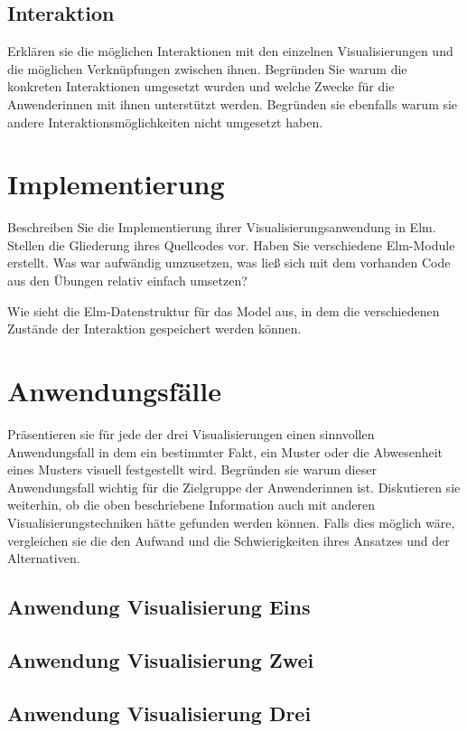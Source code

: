 \documentclass[usegeometry=true]{scrartcl}
\begin{document}
\subsection{Interaktion}
Erklären sie die möglichen Interaktionen mit den einzelnen Visualisierungen und die möglichen Verknüpfungen zwischen ihnen. Begründen Sie warum die konkreten Interaktionen umgesetzt wurden und welche Zwecke für die Anwenderinnen mit ihnen unterstützt werden. Begründen sie ebenfalls warum sie andere Interaktionsmöglichkeiten nicht umgesetzt haben. 

\section{Implementierung}
Beschreiben Sie die Implementierung ihrer Visualisierungsanwendung in Elm. Stellen die Gliederung ihres Quellcodes vor. Haben Sie verschiedene Elm-Module erstellt. Was war aufwändig umzusetzen, was ließ sich mit dem vorhanden Code aus den Übungen relativ einfach umsetzen? 

Wie sieht die Elm-Datenstruktur für das Model aus, in dem die verschiedenen Zustände der Interaktion gespeichert werden können.

\section{Anwendungsfälle}
Präsentieren sie für jede der drei Visualisierungen einen sinnvollen Anwendungsfall in dem ein bestimmter Fakt, ein Muster oder die Abwesenheit eines Musters visuell festgestellt wird. Begründen sie warum dieser Anwendungsfall wichtig für die Zielgruppe der Anwenderinnen ist. Diskutieren sie weiterhin, ob die oben beschriebene Information auch mit anderen Visualisierungstechniken hätte gefunden werden können. Falls dies möglich wäre, vergleichen sie die den Aufwand und die Schwierigkeiten ihres Ansatzes und der Alternativen. 
\subsection{Anwendung Visualisierung Eins}
\subsection{Anwendung Visualisierung Zwei}
\subsection{Anwendung Visualisierung Drei}
\end{document}

